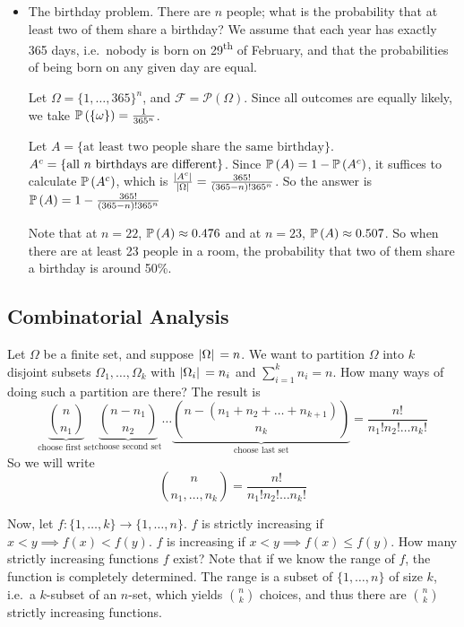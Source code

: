 \begin{itemize}
	\item The birthday problem.
	      There are \(n\) people; what is the probability that at least two of them share a birthday? We assume that each year has exactly 365 days, i.e.\ nobody is born on 29\textsuperscript{th} of February, and that the probabilities of being born on any given day are equal.

	      Let \(\Omega = \{1, \dots, 365\}^n\), and \(\mathcal F = \mathcal P(\Omega)\).
	      Since all outcomes are equally likely, we take \(\mathbb{P}\left({\{\omega\}}\right) = \frac{1}{365^n}\).

	      Let \(A = \{ \text{at least two people share the same birthday} \}\).
	      \({A}^c = \{ \text{all } n \text{ birthdays are different} \}\).
	      Since \(\mathbb{P}\left({A}\right) = 1 - \mathbb{P}\left({{A}^c}\right)\), it suffices to calculate \(\mathbb{P}\left({{A}^c}\right)\), which is \(\frac{\abs*{{A}^c}}{\abs*{\Omega}} = \frac{365!}{(365 - n)!365^n}\).
	      So the answer is \(\mathbb{P}\left({A}\right) = 1 - \frac{365!}{(365 - n)!365^n}\)

	      Note that at \(n=22\), \(\mathbb{P}\left({A}\right) \approx 0.476\) and at \(n=23\), \(\mathbb{P}\left({A}\right) \approx 0.507\).
	      So when there are at least 23 people in a room, the probability that two of them share a birthday is around 50\%.
\end{itemize}

\subsection{Combinatorial Analysis}
Let \(\Omega\) be a finite set, and suppose \(\abs*{\Omega} = n\).
We want to partition \(\Omega\) into \(k\) disjoint subsets \(\Omega_1, \dots, \Omega_k\) with \(\abs*{\Omega_i} = n_i\) and \(\sum_{i=1}^k n_i = n\).
How many ways of doing such a partition are there? The result is
\[
	\underbrace{\binom{n}{n_1}}_{\text{choose first set}}\underbrace{\binom{n-n_1}{n_2}}_{\text{choose second set}}\dots\underbrace{\binom{n-(n_1 + n_2 + \dots + n_{k+1})}{n_k}}_{\text{choose last set}} = \frac{n!}{n_1!n_2!\dots n_k!}
\]
So we will write
\[
	\binom{n}{n_1, \dots, n_k} = \frac{n!}{n_1!n_2!\dots n_k!}
\]

Now, let \(f\colon \{1, \dots, k\} \to \{1, \dots, n\}\).
\(f\) is strictly increasing if \(x < y \implies f(x) < f(y)\).
\(f\) is increasing if \(x < y \implies f(x) \leq f(y)\).
How many strictly increasing functions \(f\) exist? Note that if we know the range of \(f\), the function is completely determined.
The range is a subset of \(\{1, \dots, n\}\) of size \(k\), i.e.\ a \(k\)-subset of an \(n\)-set, which yields \(\binom{n}{k}\) choices, and thus there are \(\binom{n}{k}\) strictly increasing functions.

